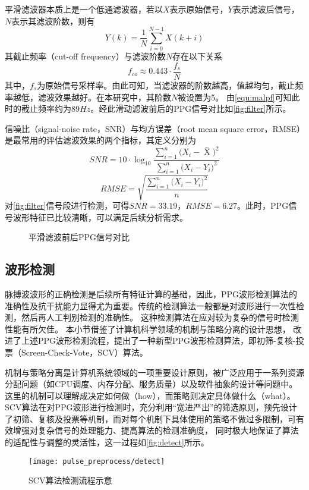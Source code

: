 平滑滤波器本质上是一个低通滤波器，若以$X$表示原始信号，$Y$表示滤波后信号，$N$表示其滤波阶数，则有
\begin{equation}
    \label{equ:filter}
    Y(k)=\frac{1}{N}\sum_{i=0}^{N-1}X(k+i)
\end{equation}
其截止频率（cut-off frequency）与滤波阶数$N$存在以下关系\cite{malp2011,malp2022}
\begin{equation}
    \label{equ:malpf}
    f_{co} \approx 0.443 \cdot \frac{f_s}{N}    
\end{equation}
其中，$f_s$为原始信号采样率。由此可知，当滤波器的阶数越高，值越均匀，截止频率越低，滤波效果越好。在本研究中，其阶数$N$被设置为5。
由\autoref{equ:malpf}可知此时的截止频率约为89$Hz$。经此滑动滤波前后的PPG信号对比如\autoref{fig:filter}所示。

信噪比（signal-noise rate，SNR）与均方误差（root mean square error，RMSE）是最常用的评估滤波效果的两个指标，其定义分别为
\begin{equation}
    \label{equ:snr}
    SNR=10 \cdot \log_{10}\frac{\sum_{i=1}^{n}{(X_i-\mathop{X} \limits^-})^2}{\sum_{i=1}^{n}{(X_i-Y_i})^2}
\end{equation}
\begin{equation}
    \label{equ:rmse}
    RMSE=\sqrt{\frac{\sum_{i=1}^{n}{(X_i-Y_i})^2}{n}}
\end{equation}
对\autoref{fig:filter}信号段进行检测，可得$SNR=33.19$，$RMSE=6.27$。此时，PPG信号波形特征已比较清晰，可以满足后续分析需求。
\begin{figure}[htbp]
    \centering
    \quad
    \caption{\label{fig:filter}平滑滤波前后PPG信号对比}
\end{figure}

\subsection{波形检测}
脉搏波波形的正确检测是后续所有特征计算的基础，因此，PPG波形检测算法的准确性及抗干扰能力显得尤为重要。传统的检测算法一般都是对波形进行一次性检测，然后再人工判别检测的准确性。
这种检测算法在应对较为复杂的信号时检测性能有所欠佳。
本小节借鉴了计算机科学领域的机制与策略分离的设计思想，
改进了上述PPG波形检测流程，提出了一种新型PPG波形检测算法，即初筛-复核-投票（Screen-Check-Vote，SCV）算法。

机制与策略分离是计算机系统领域的一项重要设计原则，被广泛应用于一系列资源分配问题（如CPU调度、内存分配、服务质量）以及软件抽象的设计等问题中\cite{Wulf1974,Levin1975,Brinch2001}。
这里的机制可以理解成决定如何做（how），而策略则决定具体做什么（what）。
SCV算法在对PPG波形进行检测时，充分利用“宽进严出”的筛选原则，预先设计了初筛、复核及投票等机制，而对每个机制下具体使用的策略不做过多限制，可有效增强对复杂信号的处理能力、提高算法的检测准确度，
同时极大地保证了算法的适配性与调整的灵活性，这一过程如\autoref{fig:detect}所示。
\begin{figure}[htbp]
    \centering
    \texttt{[image: pulse\_preprocess/detect]}
    \caption{\label{fig:detect}SCV算法检测流程示意}
\end{figure}

